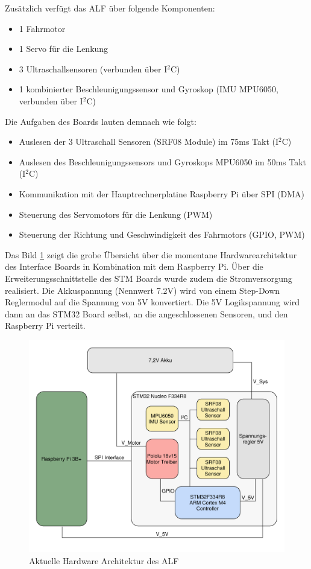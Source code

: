 Zusätzlich verfügt das ALF über folgende Komponenten:
\begin{itemize}
\item 1 Fahrmotor
\item 1 Servo für die Lenkung
\item 3 Ultraschallsensoren (verbunden über I$^{2}$C)
\item 1 kombinierter Beschleunigungssensor und Gyroskop (IMU MPU6050, verbunden über I$^{2}$C)
\end{itemize}

Die Aufgaben des Boards lauten demnach wie folgt:
\begin{itemize}
\item Auslesen der 3 Ultraschall Sensoren (SRF08 Module) im 75ms Takt (I$^{2}$C)
\item Auslesen des Beschleunigungssensors und Gyroskops MPU6050 im 50ms Takt (I$^{2}$C)
\item Kommunikation mit der Hauptrechnerplatine Raspberry Pi über SPI (DMA)
\item Steuerung des Servomotors für die Lenkung (PWM)
\item Steuerung der Richtung und Geschwindigkeit des Fahrmotors (GPIO, PWM)
\end{itemize}
Das Bild \ref{fig:IfBoardHWUebersicht} zeigt die grobe Übersicht über die momentane Hardwarearchitektur des Interface Boards in Kombination mit dem Raspberry Pi. Über die Erweiterungsschnittstelle des STM Boards wurde zudem die Stromversorgung realisiert. Die Akkuspannung (Nennwert 7.2V) wird von einem Step-Down Reglermodul auf die Spannung von 5V konvertiert. Die 5V Logikspannung wird dann an das STM32 Board selbst, an die angeschlossenen Sensoren, und den Raspberry Pi verteilt.

\begin{figure}[hbtp]
\centering
\includegraphics[scale=0.5]{images/chapter5/HW-Architecture.pdf}
\caption{Aktuelle Hardware Architektur des ALF \label{fig:IfBoardHWUebersicht}}
\end{figure}

